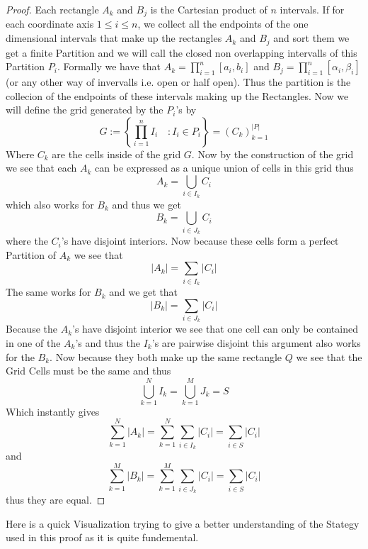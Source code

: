 \documentclass[11pt,a4paper]{article}
\theoremstyle{plain}
\theoremstyle{definition}
\begin{document}
\begin{proof}
    Each rectangle $A_k$ and $B_j$ is the Cartesian product of $n$ intervals. 
    If for each coordinate axis $1 \le i \le n$, we collect all the endpoints of the one dimensional intervals that make up the rectangles $A_k$ and $B_j$
    and sort them we get a finite Partition and we will call the closed non overlapping intervalls of this Partition $P_i$.
    Formally we have that $A_k = \prod_{i=1}^n [a_i, b_i]$ and $B_j = \prod_{i=1}^n [\alpha_i, \beta_i]$ 
    (or any other way of invervalls i.e. open or half open).
    Thus the partition is the collecion of the endpoints of these intervals making up the Rectangles.
    Now we will define the grid generated by the $P_i$'s by 
    \[
        G := \left\{ \prod_{i=1}^n I_i \quad : I_i \in P_i \right\} = (C_k)_{k=1}^{|P|} 
    \]
    Where $C_k$ are the cells inside of the grid $G$. 
    Now by the construction of the grid we see that each $A_k$ can be expressed as a unique union of cells in this grid thus 
    \[
        A_k = \bigcup_{i \in I_k} C_i
    \]
    which also works for $B_k$ and thus we get 
    \[
        B_k = \bigcup_{i \in J_k} C_i
    \]
    where the $C_i$'s have disjoint interiors.
    Now because these cells form a perfect Partition of $A_k$ we see that 
    \[
        |A_k| = \sum_{i \in I_k} |C_i|
    \]
    The same works for $B_k$ and we get that 
    \[
        |B_k| = \sum_{i \in J_k} |C_i|
    \]
    Because the $A_k$'s have disjoint interior we see that one cell can only be contained in one of the $A_k$'s and thus the $I_k$'s are pairwise disjoint 
    this argument also works for the $B_k$. 
    Now because they both make up the same rectangle $Q$ we see that the Grid Cells must be the same and thus
    \[
        \bigcup_{k=1}^N I_k = \bigcup_{k=1}^M J_k = S
    \]
    Which instantly gives 
    \[
        \sum_{k = 1}^N |A_k| = \sum_{k = 1}^N \sum_{i \in I_k} |C_i| = \sum_{i \in S} |C_i| 
    \]
    and 
    \[
        \sum_{k = 1}^M |B_k| = \sum_{k = 1}^M \sum_{i \in J_k} |C_i| = \sum_{i \in S} |C_i| 
    \]
    thus they are equal.
\end{proof}
Here is a quick Visualization trying to give a better understanding of the Stategy used in this proof as it 
is quite fundemental.
\end{document}
